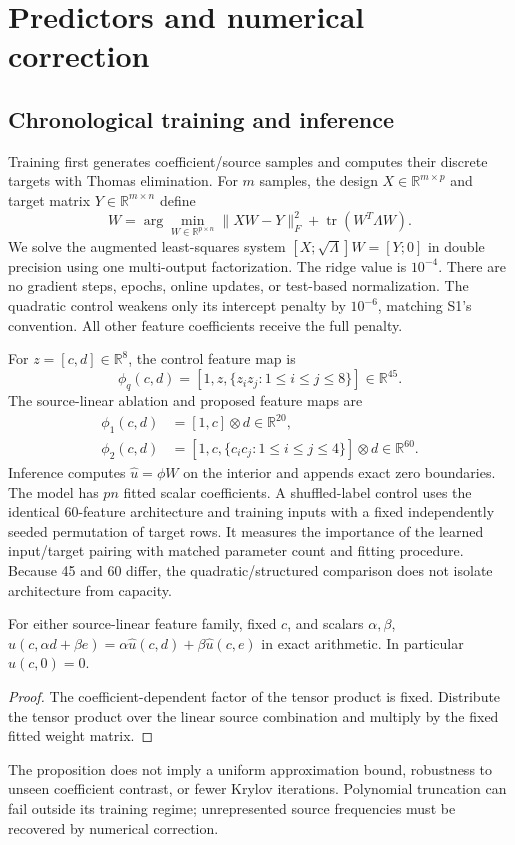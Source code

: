 \section{Predictors and numerical correction}
\subsection{Chronological training and inference}
Training first generates coefficient/source samples and computes their discrete targets with Thomas elimination. For $m$ samples, the design $X\in\mathbb R^{m\times p}$ and target matrix $Y\in\mathbb R^{m\times n}$ define
\begin{equation}
 W=\arg\min_{W\in\mathbb R^{p\times n}}\|XW-Y\|_F^2+
 \operatorname{tr}(W^T\Lambda W).
\end{equation}
We solve the augmented least-squares system $[X;\sqrt{\Lambda}]W=[Y;0]$ in double precision using one multi-output factorization. The ridge value is $10^{-4}$. There are no gradient steps, epochs, online updates, or test-based normalization. The quadratic control weakens only its intercept penalty by $10^{-6}$, matching S1's convention. All other feature coefficients receive the full penalty.

For $z=[c,d]\in\mathbb R^8$, the control feature map is
\begin{equation}
 \phi_q(c,d)=[1,z,\{z_i z_j:1\le i\le j\le8\}]\in\mathbb R^{45}.
\end{equation}
The source-linear ablation and proposed feature maps are
\begin{align}
 \phi_1(c,d)&=[1,c]\otimes d\in\mathbb R^{20},\\
 \phi_2(c,d)&=[1,c,\{c_i c_j:1\le i\le j\le4\}]\otimes d\in\mathbb R^{60}.
\end{align}
Inference computes $\hat u=\phi W$ on the interior and appends exact zero boundaries. The model has $pn$ fitted scalar coefficients. A shuffled-label control uses the identical 60-feature architecture and training inputs with a fixed independently seeded permutation of target rows. It measures the importance of the learned input/target pairing with matched parameter count and fitting procedure. Because 45 and 60 differ, the quadratic/structured comparison does not isolate architecture from capacity.

\begin{proposition}
For either source-linear feature family, fixed $c$, and scalars $\alpha,\beta$,
$\hat u(c,\alpha d+\beta e)=\alpha\hat u(c,d)+\beta\hat u(c,e)$ in exact arithmetic. In particular $\hat u(c,0)=0$.
\end{proposition}
\begin{proof}
The coefficient-dependent factor of the tensor product is fixed. Distribute the tensor product over the linear source combination and multiply by the fixed fitted weight matrix.
\end{proof}
The proposition does not imply a uniform approximation bound, robustness to unseen coefficient contrast, or fewer Krylov iterations. Polynomial truncation can fail outside its training regime; unrepresented source frequencies must be recovered by numerical correction.

